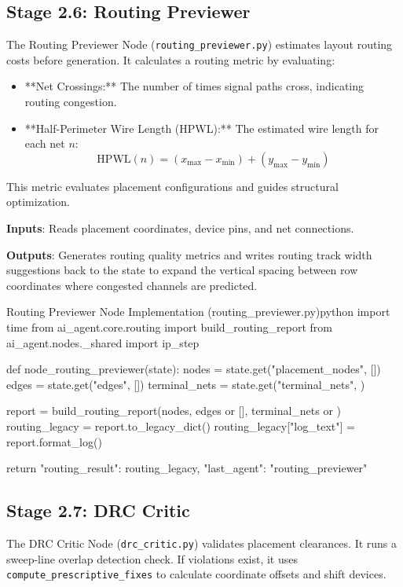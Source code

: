 \subsection{Stage 2.6: Routing Previewer}
The Routing Previewer Node (\texttt{routing\_previewer.py}) estimates layout routing costs before generation. It calculates a routing metric by evaluating:
\begin{itemize}
    \item **Net Crossings:** The number of times signal paths cross, indicating routing congestion.
    \item **Half-Perimeter Wire Length (HPWL):** The estimated wire length for each net $n$:
    \begin{equation}
        \text{HPWL}(n) = (x_{\text{max}} - x_{\text{min}}) + (y_{\text{max}} - y_{\text{min}})
    \end{equation}
\end{itemize}
This metric evaluates placement configurations and guides structural optimization.

\textbf{Inputs}: Reads placement coordinates, device pins, and net connections.

\textbf{Outputs}: Generates routing quality metrics and writes routing track width suggestions back to the state to expand the vertical spacing between row coordinates where congested channels are predicted.

\begin{thesiscode}{Routing Previewer Node Implementation (routing\_previewer.py)}{python}
import time
from ai_agent.core.routing import build_routing_report
from ai_agent.nodes._shared import ip_step

def node_routing_previewer(state):
    nodes         = state.get("placement_nodes", [])
    edges         = state.get("edges", [])
    terminal_nets = state.get("terminal_nets", {})

    report = build_routing_report(nodes, edges or [], terminal_nets or {})
    routing_legacy = report.to_legacy_dict()
    routing_legacy["log_text"] = report.format_log()

    return {
        "routing_result": routing_legacy,
        "last_agent": "routing_previewer"
    }
\end{thesiscode}

\subsection{Stage 2.7: DRC Critic}
The DRC Critic Node (\texttt{drc\_critic.py}) validates placement clearances. It runs a sweep-line overlap detection check. If violations exist, it uses \texttt{compute\_prescriptive\_fixes} to calculate coordinate offsets and shift devices.

